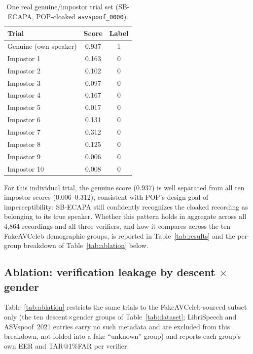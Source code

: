 \documentclass[11pt]{article}
\begin{document}
\begin{table}[H]
\centering
\caption{One real genuine/impostor trial set (SB-ECAPA, POP-cloaked \texttt{asvspoof\_0000}).}
\label{tab:example}
\begin{tabular}{lcc}
\toprule
Trial & Score & Label \\
\midrule
Genuine (own speaker)      & 0.937 & 1 \\
Impostor 1 & 0.163 & 0 \\
Impostor 2 & 0.102 & 0 \\
Impostor 3 & 0.097 & 0 \\
Impostor 4 & 0.167 & 0 \\
Impostor 5 & 0.017 & 0 \\
Impostor 6 & 0.131 & 0 \\
Impostor 7 & 0.312 & 0 \\
Impostor 8 & 0.125 & 0 \\
Impostor 9 & 0.006 & 0 \\
Impostor 10 & 0.008 & 0 \\
\bottomrule
\end{tabular}
\end{table}

For this individual trial, the genuine score (0.937) is well separated
from all ten impostor scores (0.006--0.312), consistent with POP's
design goal of imperceptibility: SB-ECAPA still confidently recognizes
the cloaked recording as belonging to its true speaker. Whether this
pattern holds in aggregate across all 4,864 recordings and all three
verifiers, and how it compares across the ten FakeAVCeleb demographic
groups, is reported in Table~\ref{tab:results} and the per-group
breakdown of Table~\ref{tab:ablation} below.

\subsection{Ablation: verification leakage by descent $\times$ gender}
\label{sec:ablation}
Table~\ref{tab:ablation} restricts the same trials to the
FakeAVCeleb-sourced subset only (the ten descent$\times$gender groups
of Table~\ref{tab:dataset}; LibriSpeech and ASVspoof~2021 entries carry
no such metadata and are excluded from this breakdown, not folded into
a fake ``unknown'' group) and reports each group's own EER and
TAR@1\%FAR per verifier.
\end{document}
